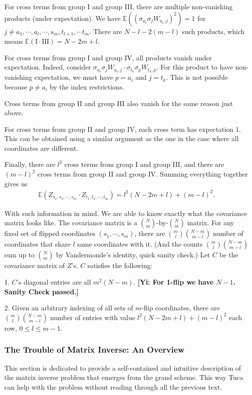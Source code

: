 \documentclass[10pt]{article}
\newcommand{\e}{\mathbb{E}}
\newcommand{\gy}[1]{\textbf{\color{red}[Yi: #1]}}
\newenvironment{Proof of lemma}{\noindent{\bf Proof of Lemma}}{\hfill$\Box$\newline}
\newenvironment{Proof of claim}{\noindent{\bf Proof of claim}}{\hfill$\Box$\newline}
\newenvironment{Proof of theorem}{\noindent{\bf Proof of Theorem}}{\hfill\scriptsize{$\Box$}\newline}
\newenvironment{Proof of theorems}{\noindent{\bf Proof of Theorems}}{\hfill$\Box$\newline}
\newenvironment{Proof of proposition}{\noindent{\bf Proof of Proposition}}{\hfill$\Box$\newline}
\newenvironment{Proof of propositions}{\noindent{\bf Proof of Propositions}}{\hfill$\Box$\newline}
\newenvironment{Proof of exercise}{\noindent{\it Proof of Exercise:}}{\hfill$\Box$}
\numberwithin{equation}{section}
\begin{document}
For cross terms from group I and group III, there are multiple non-vanishing products (under expectation). We have $\e \left((\sigma_{a_i} \sigma_j W_{a_i,j})^2 \right) = 1$ for $j \neq a_1,\cdots,a_l,\cdots,s_m, t_{l+1}, \cdots t_m$. There are $N - l - 2(m-l)$ such products, which means $\e(\text{I} \cdot \text{III}) = N -2m +l$.

For cross terms from group I and group IV, all products vanish under expectation. Indeed, consider $\sigma_{a_i} \sigma_j W_{a_i,j} \cdot \sigma_{t_k} \sigma_p W_{t_k,p}$. For this product to have non-vanishing expectation, we must have $p = a_i$ and $j = t_k$. This is not possible because $p \neq a_i$ by the index restrictions.

Cross terms from group II and group III also vanish for the same reason just above.

For cross terms from group II and group IV, each cross term has expectation 1. This can be obtained using a similar argument as the one in the case where all coordinates are different.

Finally, there are $l^2$ cross terms from group I and group III, and there are $(m-l)^2$ cross terms from group II and group IV. Summing everything together gives us
\begin{align}
    \e(Z_{s_1,s_2,\cdots,s_m} \cdot Z_{t_1,t_2,\cdots,t_m}) = l^2(N-2m+l) + (m-l)^2.
\end{align}

With such information in mind. We are able to know exactly what the covariance matrix looks like. The covariance matrix is a $\binom{N}{m}$-by-$\binom{N}{m}$ matrix. For any fixed set of flipped coordinates $(s_1,\cdots,s_m)$, there are $\binom{m}{l}\binom{N-m}{m-l}$ number of coordinates that share $l$ same coordinates with it. (And the counts $\binom{m}{l}\binom{N-m}{m-l}$ sum up to $\binom{N}{m}$ by Vandermonde's identity, quick sanity check.) Let $C$ be the covariance matrix of $Z$'s. $C$ satisfies the following:

1. $C$'s diagonal entries are all $m^2(N-m)$. \gy{For 1-flip we have $N-1$. Sanity Check passed.}

2. Given an arbitrary indexing of all sets of $m$-flip coordinates, there are $\binom{m}{l}\binom{N-m}{m-l}$ number of entries with value $l^2(N-2m+l) + (m-l)^2$ each row, $0 \leq l \leq m-1$.
\subsubsection{The Trouble of Matrix Inverse: An Overview}
This section is dedicated to provide a self-contained and intuitive description of the matrix inverse problem that emerges from the grand scheme. This way Tuca can help with the problem without reading through all the previous text.
\end{document}
